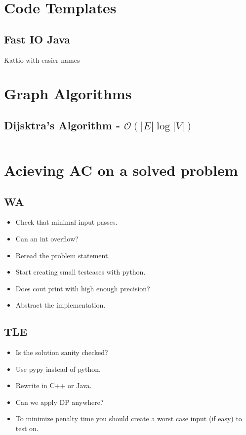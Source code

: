 \documentclass[8pt,a4paper,landscape,oneside]{amsart}
\newcommand{\code}[1]{\inputminted[fontsize=\normalsize,baselinestretch=1]{java}{code/#1}}
\newcommand{\bigO}{\mathcal{O}}
\begin{document}
\begin{multicols*}{3}
\thispagestyle{fancy}
\vspace{-3em}

\tableofcontents
\section{Code Templates}
    \subsection{Fast IO Java}
        Kattio with easier names

\section{Graph Algorithms}
    \subsection{Dijsktra's Algorithm - $\bigO(|E| \log{|V|})$}
        \code{graphs/Dijkstras.java}
\section{Acieving AC on a solved problem}
    \subsection{WA}
        \begin{itemize}
        \item Check that minimal input passes.
        \item Can an int overflow?
        \item Reread the problem statement.
        \item Start creating small testcases with python.
        \item Does cout print with high enough precision?
        \item Abstract the implementation.
        \end{itemize}
    \subsection{TLE}
        \begin{itemize}
        \item Is the solution sanity checked?
        \item Use pypy instead of python.
        \item Rewrite in C++ or Java.
        \item Can we apply DP anywhere?
        \item To minimize penalty time you should create a worst case input (if easy) to test on.
        \end{itemize}

\end{multicols*}
\end{document}
